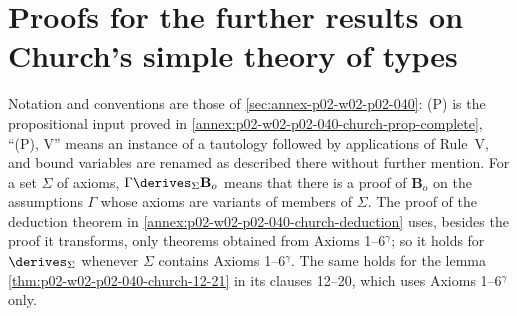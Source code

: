 \section{Proofs for the further results on Church's simple theory of types}
\label{sec:annex-p02-w02c-p02-028}

Notation and conventions are those of \cref{sec:annex-p02-w02-p02-040}: (P)
is the propositional input proved in
\cref{annex:p02-w02-p02-040-church-prop-complete}, ``(P), V'' means an
instance of a tautology followed by applications of Rule~V, and bound
variables are renamed as described there without further mention.  For a
set \(\Sigma\) of axioms, \(\Gamma\derives_\Sigma\mathbf B_o\) means that
there is a proof of \(\mathbf B_o\) on the assumptions \(\Gamma\) whose
axioms are variants of members of \(\Sigma\).  The proof of the deduction
theorem in \cref{annex:p02-w02-p02-040-church-deduction} uses, besides the
proof it transforms, only theorems obtained from Axioms 1--6\(^\gamma\); so
it holds for \(\derives_\Sigma\) whenever \(\Sigma\) contains Axioms
1--6\(^\gamma\).  The same holds for the lemma
\cref{thm:p02-w02-p02-040-church-12-21} in its clauses 12--20, which uses
Axioms 1--6\(^\gamma\) only.

